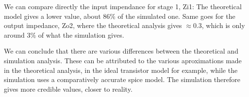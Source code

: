 We can compare directly the input impendance for stage 1, Zi1: The theoretical model gives a lower value, about $86\%$ of the simulated one. Same goes for the output impedance, Zo2, where the theoretical analysis gives $\approx 0.3$, which is only around $3\%$ of what the simulation gives.

\par
We can conclude that there are various differences between the theoretical and simulation analysis. These can be attributed to the various aproximations
made in the theoretical analysis, in the ideal transistor model for example, while the simulation uses a comparatively accurate spice model. The simulation therefore gives more credible values, closer to reality.
